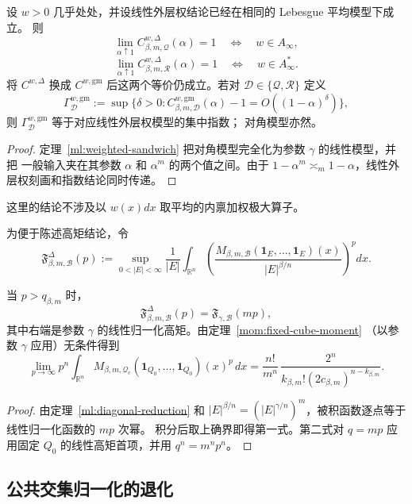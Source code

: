 \begin{corollary}[外层权的端点刻画与指数]\label{ml:weighted-endpoint}
设 $w>0$ 几乎处处，并设线性外层权结论已经在相同的 Lebesgue 平均模型下成立。
则
\[
 \lim_{\alpha\uparrow1}C^{w,\Delta}_{\beta,m,\mathcal Q}(\alpha)=1
 \quad\Longleftrightarrow\quad w\in A_\infty,
\]
\[
 \lim_{\alpha\uparrow1}C^{w,\Delta}_{\beta,m,\mathcal R}(\alpha)=1
 \quad\Longleftrightarrow\quad w\in A_\infty^*.
\]
将 $C^{w,\Delta}$ 换成 $C^{w,\mathrm{gm}}$ 后这两个等价仍成立。若对
$\mathcal D\in\{\mathcal Q,\mathcal R\}$ 定义
\[
 \Gamma^{w,\mathrm{gm}}_{\mathcal D}:=
 \sup\{\delta>0:C^{w,\mathrm{gm}}_{\beta,m,\mathcal D}(\alpha)-1
 =O((1-\alpha)^\delta)\},
\]
则 $\Gamma^{w,\mathrm{gm}}_{\mathcal D}$ 等于对应线性外层权模型的集中指数；
对角模型亦然。
\end{corollary}

\begin{proof}
定理~\ref{ml:weighted-sandwich} 把对角模型完全化为参数 $\gamma$ 的线性模型，并把
一般输入夹在其参数 $\alpha$ 和 $\alpha^m$ 的两个值之间。由于
$1-\alpha^m\asymp_m1-\alpha$，线性外层权刻画和指数结论同时传递。
\end{proof}

这里的结论不涉及以 $w(x)dx$ 取平均的内禀加权极大算子。

为便于陈述高矩结论，令
\[
 \mathfrak F^{\Delta}_{\beta,m,\mathcal B}(p)
 :=\sup_{0<|E|<\infty}\frac1{|E|}
 \int_{\mathbb R^n}
 \left(\frac{M_{\beta,m,\mathcal B}(\mathbf1_E,\ldots,\mathbf1_E)(x)}
 {|E|^{\beta/n}}\right)^p dx .
\]
\begin{proposition}[对角高矩恒等式]\label{ml:diagonal-moments}
当 $p>q_{\beta,m}$ 时，
\[
 \mathfrak F^{\Delta}_{\beta,m,\mathcal B}(p)
 =\mathfrak F_{\gamma,\mathcal B}(mp),
\]
其中右端是参数 $\gamma$ 的线性归一化高矩。由定理~\ref{mom:fixed-cube-moment}
（以参数 $\gamma$ 应用）无条件得到
\[
 \lim_{p\to\infty}p^n\int_{\mathbb R^n}
 M_{\beta,m,\mathcal Q_c}(\mathbf1_{Q_0},\ldots,\mathbf1_{Q_0})(x)^p\,dx
 =\frac{n!}{m^n}\,
 \frac{2^n}{k_{\beta,m}!(2c_{\beta,m})^{n-k_{\beta,m}}}.
\]
\end{proposition}

\begin{proof}
由定理~\ref{ml:diagonal-reduction} 和
$|E|^{\beta/n}=(|E|^{\gamma/n})^m$，被积函数逐点等于线性归一化函数的 $mp$ 次幂。
积分后取上确界即得第一式。第二式对 $q=mp$ 应用固定 $Q_0$ 的线性高矩首项，并用
$q^n=m^np^n$。
\end{proof}

\subsection{公共交集归一化的退化}

